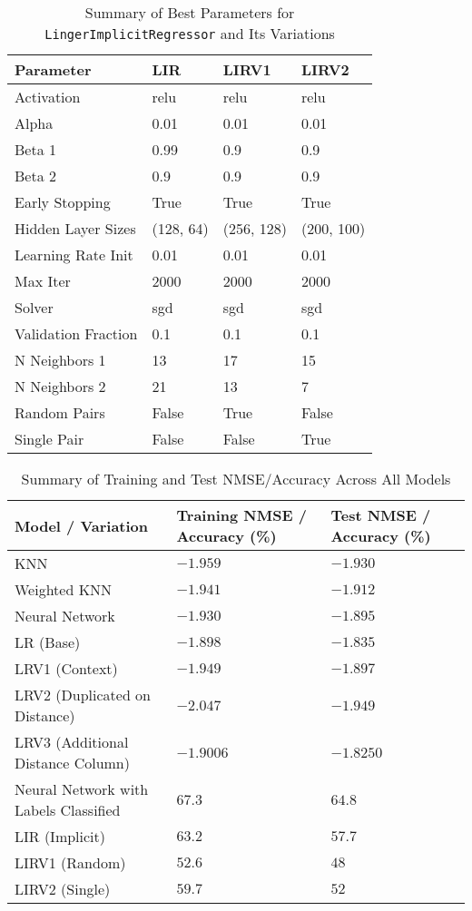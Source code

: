 \documentclass[a4paper, 12pt]{report}
\begin{document}
\begin{table}[H]
    \centering
    \caption{Summary of Best Parameters for \texttt{LingerImplicitRegressor} and Its Variations}
    \label{tab:best_parameters_LingerImageRegressor_variations_exp2}
    \begin{tabular}{|l|l|l|l|}
    \hline
    \textbf{Parameter} & \textbf{LIR} & \textbf{LIRV1} & \textbf{LIRV2} \\
    \hline
    Activation & relu & relu & relu \\
    Alpha & 0.01 & 0.01 & 0.01 \\
    Beta 1 & 0.99 & 0.9 & 0.9 \\
    Beta 2 & 0.9 & 0.9 & 0.9 \\
    Early Stopping & True & True & True \\
    Hidden Layer Sizes & (128, 64) & (256, 128) & (200, 100) \\
    Learning Rate Init & 0.01 & 0.01 & 0.01 \\
    Max Iter & 2000 & 2000 & 2000 \\
    Solver & sgd & sgd & sgd \\
    Validation Fraction & 0.1 & 0.1 & 0.1 \\
    N Neighbors 1 & 13 & 17 & 15 \\
    N Neighbors 2 & 21 & 13 & 7 \\
    Random Pairs & False & True & False \\
    Single Pair & False & False & True \\
    \hline
    \end{tabular}
\end{table}

\begin{table}[H]
    \centering
    \caption{Summary of Training and Test NMSE/Accuracy Across All Models}
    \label{tab:summary_accuracy_all_models_exp2}
    \begin{tabular}{|l|l|l|}
    \toprule
    \textbf{Model / Variation} & \textbf{Training NMSE / Accuracy (\%)} & \textbf{Test NMSE / Accuracy (\%)} \\
    \midrule
    KNN & $-1.959$ & $-1.930$ \\
    Weighted KNN & $-1.941$ & $-1.912$ \\
    Neural Network & $-1.930$ & $-1.895$ \\
    LR (Base) & $-1.898$ & $-1.835$ \\
    LRV1 (Context) & $-1.949$ & $-1.897$ \\
    LRV2 (Duplicated on Distance) & $-2.047$ & $-1.949$ \\
    LRV3 (Additional Distance Column) & $-1.9006$ & $\mathbf{-1.8250}$ \\
    Neural Network with Labels Classified& $67.3$ & $\mathbf{64.8}$ \\
    LIR (Implicit) & $63.2$ & $57.7$ \\
    LIRV1 (Random) & $52.6$ & $48$ \\
    LIRV2 (Single) & $59.7$ & $52$ \\
    \bottomrule
    \end{tabular}
\end{table}
\end{document}
